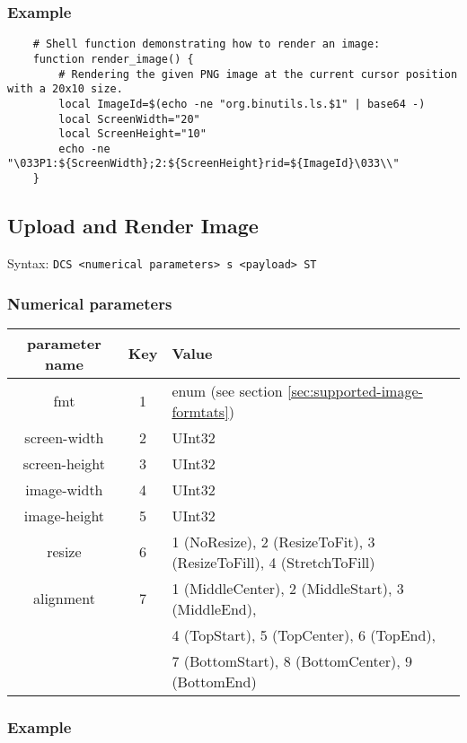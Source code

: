 \documentclass[a4paper]{article}
\newcommand{\code}[1]{\colorbox{light-gray}{\texttt{#1}}}
\begin{document}
\subsubsection*{Example}

\begin{verbatim}
    # Shell function demonstrating how to render an image:
    function render_image() {
        # Rendering the given PNG image at the current cursor position with a 20x10 size.
        local ImageId=$(echo -ne "org.binutils.ls.$1" | base64 -)
        local ScreenWidth="20"
        local ScreenHeight="10"
        echo -ne "\033P1:${ScreenWidth};2:${ScreenHeight}rid=${ImageId}\033\\"
    }
\end{verbatim}

\subsection{Upload and Render Image}

Syntax: \code{DCS <numerical parameters> s <payload> ST}

\subsubsection*{Numerical parameters}

\begin{tabular}{ |c|c|l| }
    \hline
    \textbf{parameter name}   & \textbf{Key} & \textbf{Value} \\
    \hline
    fmt         & 1   & enum (see section \ref{sec:supported-image-formtats}) \\
    screen-width  & 2   & UInt32 \\
    screen-height & 3   & UInt32 \\
    image-width & 4   & UInt32 \\
    image-height& 5   & UInt32 \\
    resize      & 6   & 1 (NoResize), 2 (ResizeToFit), 3 (ResizeToFill), 4 (StretchToFill) \\
    alignment   & 7   & 1 (MiddleCenter), 2 (MiddleStart), 3 (MiddleEnd), \\
                &     & 4 (TopStart), 5 (TopCenter), 6 (TopEnd), \\
                &     & 7 (BottomStart), 8 (BottomCenter), 9 (BottomEnd) \\
    \hline
\end{tabular}

\subsubsection*{Example}
\end{document}
